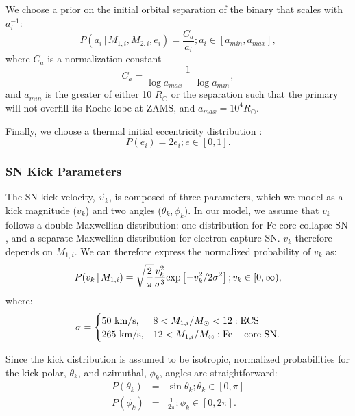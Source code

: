 \documentclass[usenatbib]{mnras}
\newcommand{\given}{\,|\,}
\newcommand{\Msun}{\ifmmode {M_{\odot}}\else${M_{\odot}}$\fi}
\begin{document}
We choose a prior on the initial orbital separation of the binary that scales with $a_i^{-1}$:
\begin{equation}
P(a_i \given M_{1,i}, M_{2,i}, e_i) = \frac{C_a}{a_i}; a_i \in [a_{min}, a_{max}],
\end{equation}
where $C_a$ is a normalization constant
\begin{equation}
C_a = \frac{1}{\log a_{max} - \log a_{min}},
\end{equation}
and $a_{min}$ is the greater of either 10 $R_{\odot}$ or the separation such that the primary will not overfill its Roche lobe at ZAMS, and $a_{max} = 10^4 R_{\odot}$. 

Finally, we choose a thermal initial eccentricity distribution \citep{ambartsumian37, duquennoy91}:
\begin{equation}
P(e_i) = 2e_i; e \in[0,1].
\end{equation}


\subsubsection{SN Kick Parameters}

The SN kick velocity, $\vec{v}_k$, is composed of three parameters, which we model as a kick magnitude ($v_k$) and two angles ($\theta_k, \phi_k$). In our model, we assume that $v_k$ follows a double Maxwellian distribution: one distribution for Fe-core collapse SN \citep[with a dispersion of 265 km s$^{-1}$][]{hobbs05}, and a separate Maxwellian distribution for electron-capture SN. $v_k$ therefore depends on $M_{1,i}$. We can therefore express the normalized probability of $v_k$ as:
\begin{equation}
P(v_k \given M_{1,i}) = \sqrt{\frac{2}{\pi}} \frac{v_k^2} {\sigma^3} {\rm exp} \left[ -v_k^2 / 2 \sigma^2 \right]; v_k \in [0, \infty), \label{eq:P_v_k}
\end{equation}
where:
\begin{equation}
\sigma = 
\begin{cases} 
      50\ {\rm km/s}, & 8 < M_{1,i}/\Msun < 12: {\rm ECS}\\
     265\ {\rm km/s}, & 12 < M_{1,i}/\Msun: {\rm Fe-core\ SN}.
   \end{cases}
\end{equation}


Since the kick distribution is assumed to be isotropic, normalized probabilities for the kick polar, $\theta_k$, and azimuthal, $\phi_k$, angles are straightforward:
\begin{eqnarray}
P(\theta_k) &=& \sin \theta_k; \theta_k \in [0, \pi] \label{eq:P_theta_k} \\
P(\phi_k) &=& \frac{1}{2 \pi}; \phi_k \in [0, 2\pi] . \label{eq:P_phi_k}
\end{eqnarray}
\end{document}
